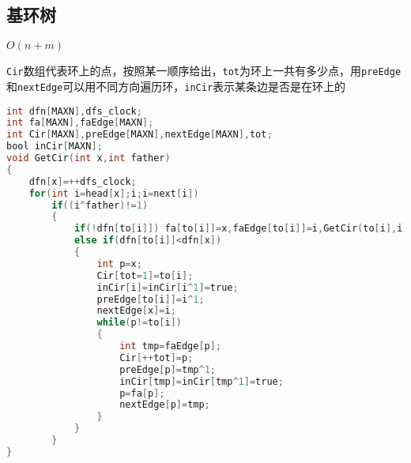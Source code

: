 \subsection{基环树}
$O(n+m)$

\texttt{Cir}数组代表环上的点，按照某一顺序给出，\texttt{tot}为环上一共有多少点，用\texttt{preEdge}和\texttt{nextEdge}可以用不同方向遍历环，\texttt{inCir}表示某条边是否是在环上的
\begin{lstlisting}[language=C]
int dfn[MAXN],dfs_clock;
int fa[MAXN],faEdge[MAXN];
int Cir[MAXN],preEdge[MAXN],nextEdge[MAXN],tot;
bool inCir[MAXN];
void GetCir(int x,int father)
{
    dfn[x]=++dfs_clock;
    for(int i=head[x];i;i=next[i])
        if((i^father)!=1)
        {
            if(!dfn[to[i]]) fa[to[i]]=x,faEdge[to[i]]=i,GetCir(to[i],i);
            else if(dfn[to[i]]<dfn[x])
            {
                int p=x;
                Cir[tot=1]=to[i];
                inCir[i]=inCir[i^1]=true;
                preEdge[to[i]]=i^1;
                nextEdge[x]=i;
                while(p!=to[i])
                {
                    int tmp=faEdge[p];
                    Cir[++tot]=p;
                    preEdge[p]=tmp^1;
                    inCir[tmp]=inCir[tmp^1]=true; 
                    p=fa[p];
                    nextEdge[p]=tmp;
                }
            }
        }
}
\end{lstlisting}